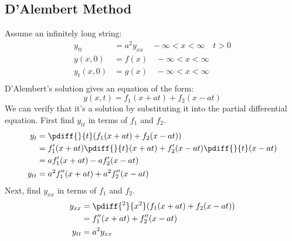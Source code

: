 \documentclass{math}
\begin{document}
\subsection*{D'Alembert Method}
Assume an infinitely long string:
\begin{align*}
  y_{tt} &= a^2y_{xx} \quad -\infty<x<\infty \quad t>0 \\
  y(x,0) &= f(x) \quad -\infty<x<\infty \\
  y_t(x,0) &= g(x) \quad -\infty<x<\infty \\
\end{align*}
D'Alembert's solution gives an equation of the form:
\[ y(x,t) = f_1(x+at)+f_2(x-at) \]
We can verify that it's a solution by substituting it into the partial
differential equation. First find \( y_{tt} \) in terms of \( f_1 \) and
\( f_2 \).
\begin{align*}
  y_t &= \pdiff{}{t}(f_1(x+at)+f_2(x-at)) \\
  &= f_1'(x+at)\pdiff{}{t}(x+at)+f_2'(x-at)\pdiff{}{t}(x-at) \\
  &= af_1'(x+at)-af_2'(x-at) \\
  y_{tt} &= a^2f_1''(x+at)+a^2f_2''(x-at)
\end{align*}
Next, find \( y_{xx} \) in terms of \( f_1 \) and \( f_2 \).
\begin{align*}
  y_{xx} &= \pdiff{^2}{x^2}(f_1(x+at)+f_2(x-at)) \\
  &= f_1''(x+at)+f_2''(x-at) \\
  y_{tt} &= a^2y_{xx}
\end{align*}
\end{document}
